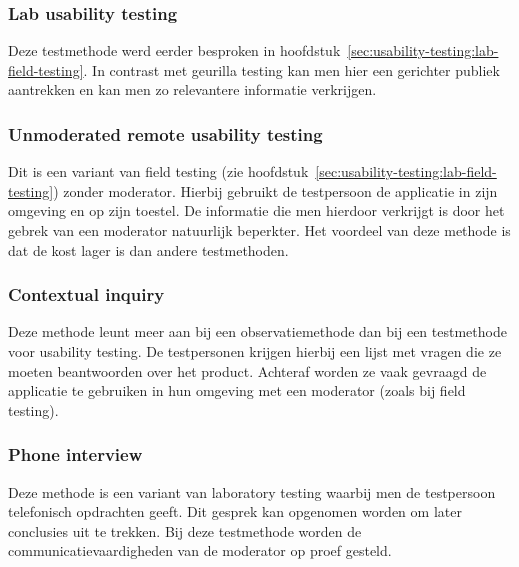 \subsubsection{Lab usability testing}
\label{sec:usability-testing:testmethoden:lab}

Deze testmethode werd eerder besproken in hoofdstuk~\ref{sec:usability-testing:lab-field-testing}. In contrast met geurilla testing kan men hier een gerichter publiek aantrekken en kan men zo relevantere informatie verkrijgen.

\subsubsection{Unmoderated remote usability testing}
\label{sec:usability-testing:testmethoden:unmoderated-remote}

Dit is een variant van field testing (zie hoofdstuk~\ref{sec:usability-testing:lab-field-testing}) zonder moderator. Hierbij gebruikt de testpersoon de applicatie in zijn omgeving en op zijn toestel. De informatie die men hierdoor verkrijgt is door het gebrek van een moderator natuurlijk beperkter. Het voordeel van deze methode is dat de kost lager is dan andere testmethoden.

\subsubsection{Contextual inquiry}
\label{sec:usability-testing:testmethoden:contextual-inquiry}

Deze methode leunt meer aan bij een observatiemethode dan bij een testmethode voor usability testing. De testpersonen krijgen hierbij een lijst met vragen die ze moeten beantwoorden over het product. Achteraf worden ze vaak gevraagd de applicatie te gebruiken in hun omgeving met een moderator (zoals bij field testing).

\subsubsection{Phone interview}
\label{sec:usability-testing:testmethoden:phone}

Deze methode is een variant van laboratory testing waarbij men de testpersoon telefonisch opdrachten geeft. Dit gesprek kan opgenomen worden om later conclusies uit te trekken. Bij deze testmethode worden de communicatievaardigheden van de moderator op proef gesteld.

